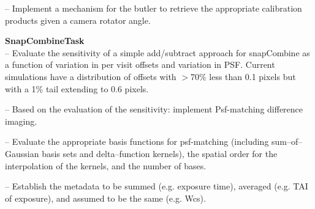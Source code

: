 \documentclass[prd, nofootinbib, floatfix, 11pt,tightenlines,times]{article}
\def\arcsec{^{\prime\prime}}
\begin{document}
-- Implement a mechanism for the butler to retrieve the appropriate calibration products given a camera rotator angle.

{\bf SnapCombineTask}\\

-- Evaluate the sensitivity of a simple add/subtract approach for
snapCombine as a function of variation in per visit offsets and
variation in PSF. Current simulations have a distribution of offsets
with $>$70\% less than 0.1 pixels but with a 1\% tail extending to 0.6
pixels.

-- Based on the evaluation of the sensitivity: implement Psf-matching
difference imaging.

-- Evaluate the appropriate basis functions for psf-matching
(including sum--of--Gaussian basis sets and  delta--function kernels),
the spatial order for the interpolation of the kernels,  and the
number of bases.

-- Establish the metadata to be summed (e.g. exposure time), averaged
(e.g. TAI of exposure), and assumed to be the same (e.g. Wcs).




%


\end{document}
